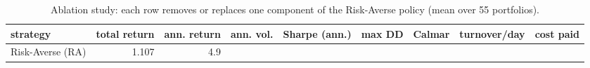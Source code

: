 \begin{table}[ht!]
\centering
\small
\begin{tabular}{lrrrrrrrr}
\hline
strategy & total return & ann. return & ann. vol. & Sharpe (ann.) & max DD & Calmar & turnover/day & cost paid \\
\hline
Risk-Averse (RA) & 1.107 & 4.9%
\hline
\end{tabular}
\caption{Ablation study: each row removes or replaces one component of the Risk-Averse policy (mean over 55 portfolios).}
\label{tab:ablation_partial}
\end{table}
